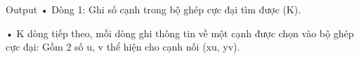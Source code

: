 Output
• Dòng 1: Ghi số cạnh trong bộ ghép cực đại tìm được (K).   


   • K dòng tiếp theo, mỗi dòng ghi thông tin về một cạnh được chọn vào bộ ghép cực đại: Gồm 2 số u, v thể hiện cho cạnh nối (xu, yv).